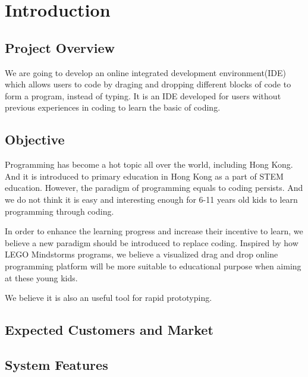 \documentclass[CSCI3100_Documentation]{subfiles}
\begin{document}
  \chapter{Introduction}
  \section{Project Overview}
  We are going to develop an online integrated development environment(IDE) which allows users to code by draging and dropping different blocks of code to form a program, instead of typing. It is an IDE developed for users without previous experiences in coding to learn the basic of coding.
  \section{Objective}
  Programming has become a hot topic all over the world, including Hong Kong. And it is introduced to primary education in Hong Kong as a part of STEM education. However, the paradigm of programming equals to coding persists. And we do not think it is easy and interesting enough for 6-11 years old kids to learn programming through coding.

  In order to enhance the learning progress and increase their incentive to learn, we believe a new paradigm should be introduced to replace coding. Inspired by how LEGO\textsuperscript{\textregistered} Mindstorms\textsuperscript{\textregistered} programs, we believe a visualized drag and drop online programming platform will be more suitable to educational purpose when aiming at these young kids.

  We believe it is also an useful tool for rapid prototyping.
  \section{Expected Customers and Market}
  \section{System Features}
\end{document}
